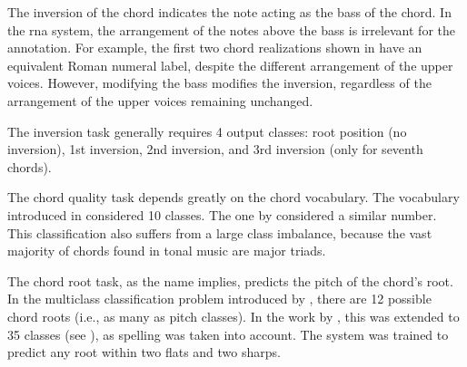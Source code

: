 
The inversion of the chord indicates the note acting as the
bass of the chord. In the \gls{rna} system, the arrangement
of the notes above the bass is irrelevant for the
annotation. For example, the first two chord realizations
shown in  have an equivalent Roman numeral
label, despite the different arrangement of the upper
voices. However, modifying the bass modifies the inversion,
regardless of the arrangement of the upper voices remaining
unchanged.


The inversion task generally requires 4 output classes: root
position (no inversion), 1st inversion, 2nd inversion, and
3rd inversion (only for seventh chords).


The chord quality task depends greatly on the chord
vocabulary. The vocabulary introduced in
\textcite{chen2018functional} considered 10 classes. The one
by \textcite{micchi2020not} considered a similar number.
This classification also suffers from a large class
imbalance, because the vast majority of chords found in
tonal music are major triads.


The chord root task, as the name implies, predicts the pitch
of the chord's root. In the multiclass classification
problem introduced by \textcite{chen2018functional}, there
are 12 possible chord roots (i.e., as many as pitch
classes). In the work by \textcite{micchi2020not}, this was
extended to 35 classes (see
), as spelling was
taken into account. The system was trained to predict any
root within two flats and two sharps. 
